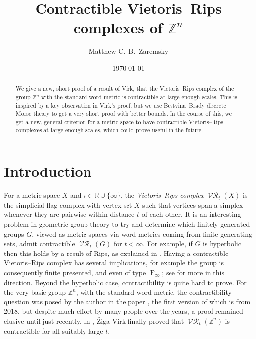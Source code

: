 \documentclass[a4paper,11pt]{amsart}
\theoremstyle{definition}
\newcommand{\Z}{\mathbb{Z}}
\newcommand{\R}{\mathbb{R}}
\DeclareMathOperator{\Rips}{\mathcal{VR}}
\DeclareMathOperator{\F}{F}
\numberwithin{equation}{section}
\begin{document}
\title{Contractible Vietoris--Rips complexes of $\mathbb{Z}^n$}
\date{\today}


\author[M.~C.~B.~Zaremsky]{Matthew C.~B.~Zaremsky}
\address{Department of Mathematics and Statistics, University at Albany (SUNY), Albany, NY}

\begin{abstract}
We give a new, short proof of a result of Virk, that the Vietoris--Rips complex of the group $\Z^n$ with the standard word metric is contractible at large enough scales. This is inspired by a key observation in Virk's proof, but we use Bestvina--Brady discrete Morse theory to get a very short proof with better bounds. In the course of this, we get a new, general criterion for a metric space to have contractible Vietoris--Rips complexes at large enough scales, which could prove useful in the future.
\end{abstract}

\maketitle
\thispagestyle{empty}


\section{Introduction}

For a metric space $X$ and $t\in\R\cup\{\infty\}$, the \emph{Vietoris--Rips complex} $\Rips_t(X)$ is the simplicial flag complex with vertex set $X$ such that vertices span a simplex whenever they are pairwise within distance $t$ of each other. It is an interesting problem in geometric group theory to try and determine which finitely generated groups $G$, viewed as metric spaces via word metrics coming from finite generating sets, admit contractible $\Rips_t(G)$ for $t<\infty$. For example, if $G$ is hyperbolic then this holds by a result of Rips, as explained in \cite[III.$\Gamma$.3.23]{bridson99}. Having a contractible Vietoris--Rips complex has several implications, for example the group is consequently finite presented, and even of type $\F_\infty$; see \cite{zaremsky22} for more in this direction. Beyond the hyperbolic case, contractibility is quite hard to prove. For the very basic group $\Z^n$, with the standard word metric, the contractibility question was posed by the author in the paper \cite{zaremsky22}, the first version of which is from 2018, but despite much effort by many people over the years, a proof remained elusive until just recently. In \cite{virk25}, \v Ziga Virk finally proved that $\Rips_t(\Z^n)$ is contractible for all suitably large $t$.
\end{document}
